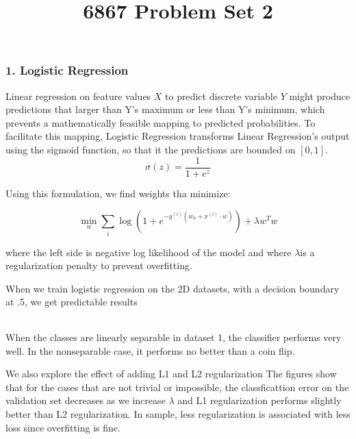 \documentclass[10pt]{article}
\begin{document}
	\title{6867 Problem Set 2}
	\maketitle

\subsubsection*{1. Logistic Regression}
Linear regression on feature values $X$ to predict discrete variable $Y$ might produce predictions that larger
than Y's maximum or less than Y's minimum, which prevents a mathematically feasible mapping to predicted probabilities.
To facilitate this mapping, Logistic Regression transforms Linear Regression's output using the sigmoid function,
so that it the predictions are bounded on $[0,1]$.
\begin{equation}
	\sigma(z) = \frac{1}{1+e^{z}}
\end{equation}

Using this formulation, we find weights tha minimize:

\begin{equation}
	\min_w \sum_i \log \left(1+e^{-y^{(i)}(w_0 + x^{(i)}\cdot w)} \right) + \lambda w^T w
\end{equation}

where the left side is negative log likelihood of the model and where $\lambda$is a regularization penalty to prevent overfitting.

When we train logistic regression on the 2D datasets, with a decision boundary at .5, we get predictable results

\begin{table}[ht]
\centering
{}
\begin{tabular}{lrrrr}
\end{tabular}
\end{table}

When the classes are linearly separable in dataset 1, the classifier performs very well. In the nonseparable case, it performs no better than a coin flip.

We also explore the effect of adding L1 and L2 regularization  The figures show that for the cases that are not trivial or impossible, 
the classficattion error on the validation set decreases as we increase $\lambda$ and L1 regularization performs
slightly better than L2 regularization. In sample, less regularization is associated with less loss since overfitting is fine.
\end{document}
